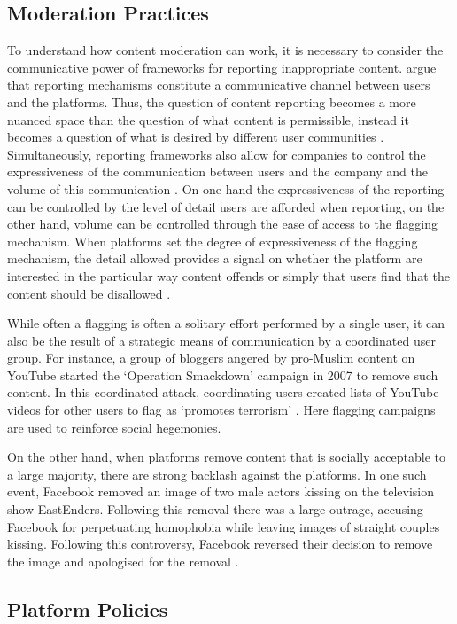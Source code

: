\subsection{Moderation Practices}
To understand how content moderation can work, it is necessary to consider the communicative power of frameworks for reporting inappropriate content.
\citet{Crawford:2016} argue that reporting mechanisms constitute a communicative channel between users and the platforms.
Thus, the question of content reporting becomes a more nuanced space than the question of what content is permissible, instead it becomes a question of what is desired by different user communities \citep{Crawford:2016}.
Simultaneously, reporting frameworks also allow for companies to control the expressiveness of the communication between users and the company and the volume of this communication \citep{Crawford:2016}.
On one hand the expressiveness of the reporting can be controlled by the level of detail users are afforded when reporting, on the other hand, volume can be controlled through the ease of access to the flagging mechanism.
When platforms set the degree of expressiveness of the flagging mechanism, the detail allowed provides a signal on whether the platform are interested in the particular way content offends or simply that users find that the content should be disallowed \citep{Crawford:2016}.

While often a flagging is often a solitary effort performed by a single user, it can also be the result of a strategic means of communication by a coordinated user group.
For instance, a group of bloggers angered by pro-Muslim content on YouTube started the `Operation Smackdown' campaign in 2007 to remove such content.
In this coordinated attack, coordinating users created lists of YouTube videos for other users to flag as `promotes terrorism' \citep{Crawford:2016}.
Here flagging campaigns are used to reinforce social hegemonies.

On the other hand, when platforms remove content that is socially acceptable to a large majority, there are strong backlash against the platforms.
In one such event, Facebook removed an image of two male actors kissing on the television show EastEnders.
Following this removal there was a large outrage, accusing Facebook for perpetuating homophobia while leaving images of straight couples kissing.
Following this controversy, Facebook reversed their decision to remove the image and apologised for the removal \citep{Crawford:2016}.

\subsection{Platform Policies}

